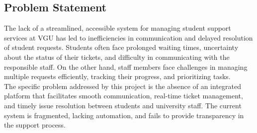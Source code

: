\subsection{Problem Statement}
The lack of a streamlined, accessible system for managing student support services at VGU has led to inefficiencies in communication and delayed resolution of student requests. Students often face prolonged waiting times, uncertainty about the status of their tickets, and difficulty in communicating with the responsible staff. On the other hand, staff members face challenges in managing multiple requests efficiently, tracking their progress, and prioritizing tasks. \\
\noindent The specific problem addressed by this project is the absence of an integrated platform that facilitates smooth communication, real-time ticket management, and timely issue resolution between students and university staff. The current system is fragmented, lacking automation, and fails to provide transparency in the support process.



